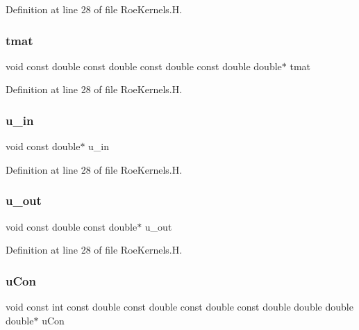Definition at line 28 of file Roe\+Kernels.\+H.

\hypertarget{RoeKernels_8H_ae5000afe2aef5d2927a3f3ec02cb4e2e}{}\label{RoeKernels_8H_ae5000afe2aef5d2927a3f3ec02cb4e2e} 
\subsubsection{\texorpdfstring{tmat}{tmat}}
{\footnotesize\ttfamily void const double const double const double const double double$\ast$ tmat}



Definition at line 28 of file Roe\+Kernels.\+H.

\hypertarget{RoeKernels_8H_a2bf6aff605796b2e670cbe75c3e872e2}{}\label{RoeKernels_8H_a2bf6aff605796b2e670cbe75c3e872e2} 
\subsubsection{\texorpdfstring{u\+\_\+in}{u\_in}}
{\footnotesize\ttfamily void const double$\ast$ u\+\_\+in}



Definition at line 28 of file Roe\+Kernels.\+H.

\hypertarget{RoeKernels_8H_aa81f1dc40301dafeb750cbf32d8d3833}{}\label{RoeKernels_8H_aa81f1dc40301dafeb750cbf32d8d3833} 
\subsubsection{\texorpdfstring{u\+\_\+out}{u\_out}}
{\footnotesize\ttfamily void const double const double$\ast$ u\+\_\+out}



Definition at line 28 of file Roe\+Kernels.\+H.

\hypertarget{RoeKernels_8H_afbfc1812dadf64d47879e3085e3dd1d0}{}\label{RoeKernels_8H_afbfc1812dadf64d47879e3085e3dd1d0} 
\subsubsection{\texorpdfstring{u\+Con}{uCon}}
{\footnotesize\ttfamily void const int const double const double const double const double double double double$\ast$ u\+Con}



